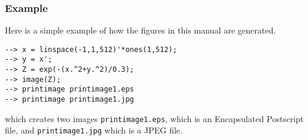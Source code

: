 \subsubsection{Example}
Here is a simple example of how the figures in this manual are generated.
\begin{verbatim}
--> x = linspace(-1,1,512)'*ones(1,512);
--> y = x';
--> Z = exp(-(x.^2+y.^2)/0.3);
--> image(Z);
--> printimage printimage1.eps
--> printimage printimage1.jpg
\end{verbatim}
which creates two images \verb|printimage1.eps|, which is an Encapsulated
Postscript file, and \verb|printimage1.jpg| which is a JPEG file.

